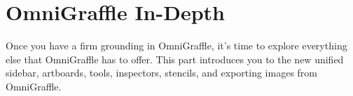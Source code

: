\documentclass[../main.tex]{subfiles}
\begin{document}
\part{OmniGraffle In-Depth}
Once you have a firm grounding in OmniGraffle, it’s time to explore everything else that OmniGraffle has to
offer. This part introduces you to the new unified sidebar, artboards, tools, inspectors, stencils, and
exporting images from OmniGraffle.












\end{document}
